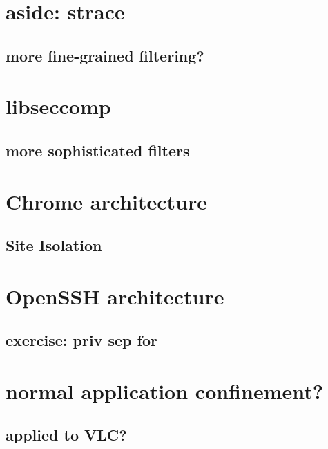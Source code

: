 \section{aside: strace}


\subsection{more fine-grained filtering?}






\section{libseccomp}



\subsection{more sophisticated filters}
\section{Chrome architecture}


\subsection{Site Isolation}


\section{OpenSSH architecture}


\subsection{exercise: priv sep for}


\section{normal application confinement?}



\subsection{applied to VLC?}


